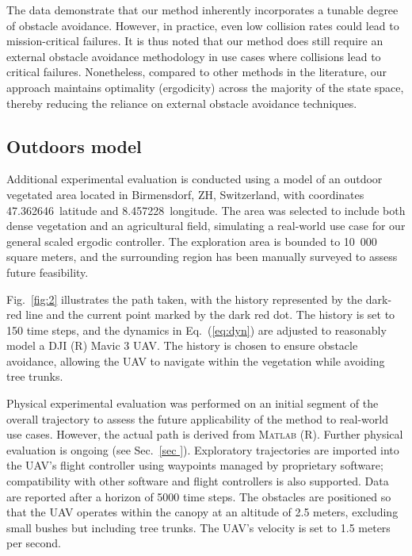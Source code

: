 \documentclass[letterpaper,10pt,conference,twoside]{IEEEtran}
\theoremstyle{definition}
\begin{document}
The data demonstrate that our method inherently incorporates a tunable degree of obstacle avoidance. However, in practice, even low collision rates could lead to mission-critical failures. It is thus noted that our method does still require an external obstacle avoidance methodology in use cases where collisions lead to critical failures. Nonetheless, compared to other methods in the literature, our approach maintains optimality (ergodicity) across the majority of the state space, thereby reducing the reliance on external obstacle avoidance techniques.

\subsection{Outdoors model}\label{sec:res3}
\noindent
Additional experimental evaluation is conducted using a model of an outdoor vegetated area located in Birmensdorf, ZH, Switzerland, with coordinates 47.362646\textdegree~latitude and 8.457228\textdegree~longitude. The area was selected to include both dense vegetation and an agricultural field, simulating a real-world use case for our general scaled ergodic controller. The exploration area is bounded to 10~000 square meters, and the surrounding region has been manually surveyed to assess future feasibility.

Fig.~\ref{fig:2} illustrates the path taken, with the history represented by the dark-red line and the current point marked by the dark red dot. The history is set to 150 time steps, and the dynamics in Eq.~(\ref{eq:dyn}) are adjusted to reasonably model a DJI (R) Mavic 3 UAV. The history is chosen to ensure obstacle avoidance, allowing the UAV to navigate within the vegetation while avoiding tree trunks.

Physical experimental evaluation was performed on an initial segment of the overall trajectory to assess the future applicability of the method to real-world use cases. However, the actual path is derived from \textsc{Matlab} (R). Further physical evaluation is ongoing (see Sec.~\ref{sec
}). Exploratory trajectories are imported into the UAV's flight controller using waypoints managed by proprietary software; compatibility with other software and flight controllers is also supported. Data are reported after a horizon of 5000 time steps. The obstacles are positioned so that the UAV operates within the canopy at an altitude of 2.5 meters, excluding small bushes but including tree trunks. The UAV's velocity is set to 1.5 meters per second.
\end{document}
